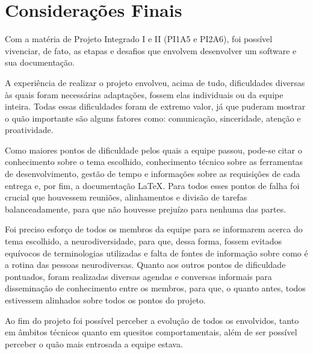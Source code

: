 \chapter{Considerações Finais}
Com a matéria de Projeto Integrado I e II (PI1A5 e PI2A6), foi possível vivenciar, de fato, as etapas e desafios que envolvem desenvolver um software e sua documentação.

A experiência de realizar o projeto envolveu, acima de tudo, dificuldades diversas às quais foram necessárias adaptações, fossem elas individuais ou da equipe inteira. Todas essas dificuldades foram de extremo valor, já que puderam mostrar o quão importante são alguns fatores como: comunicação, sinceridade, atenção e proatividade.

Como maiores pontos de dificuldade pelos quais a equipe passou, pode-se citar o conhecimento sobre o tema escolhido, conhecimento técnico sobre as ferramentas de desenvolvimento, gestão de tempo e informações sobre as requisições de cada entrega e, por fim, a documentação LaTeX. Para todos esses pontos de falha foi crucial que houvessem reuniões, alinhamentos e divisão de tarefas balanceadamente, para que não houvesse prejuízo para nenhuma das partes.

Foi preciso esforço de todos os membros da equipe para se informarem acerca do tema escolhido, a neurodiversidade, para que, dessa forma, fossem evitados equívocos de terminologias utilizadas e falta de fontes de informação sobre como é a rotina das pessoas neurodiversas. Quanto aos outros pontos de dificuldade pontuados, foram realizadas diversas agendas e conversas informais para disseminação de conhecimento entre os membros, para que, o quanto antes, todos estivessem alinhados sobre todos os pontos do projeto.

Ao fim do projeto foi possível perceber a evolução de todos os envolvidos, tanto em âmbitos técnicos quanto em quesitos comportamentais, além de ser possível perceber o quão mais entrosada a equipe estava.

